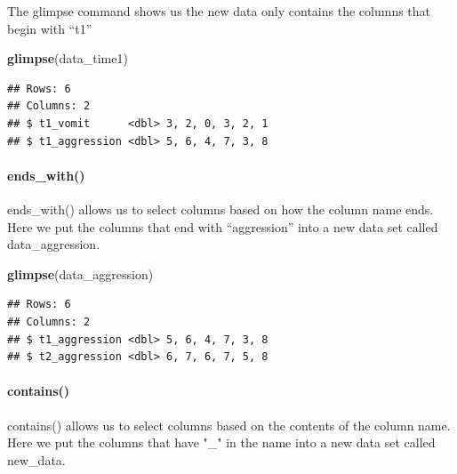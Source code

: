 \documentclass[
]{krantz}
\makeatletter
\newenvironment{Shaded}{\begin{snugshade}}{\end{snugshade}}
\newcommand{\KeywordTok}[1]{\textcolor[rgb]{0.27,0.27,0.27}{\textbf{#1}}}
\newcommand{\NormalTok}[1]{#1}
\newcommand{\OperatorTok}[1]{\textcolor[rgb]{0.43,0.43,0.43}{\textbf{#1}}}
\newcommand{\StringTok}[1]{\textcolor[rgb]{0.5,0.5,0.5}{#1}}
\newenvironment{kframe}{%
\medskip{}
\setlength{\fboxsep}{.8em}
 \def\at@end@of@kframe{}%
 \ifinner\ifhmode%
  \def\at@end@of@kframe{\end{minipage}}%
  \begin{minipage}{\columnwidth}%
 \fi\fi%
 \def\FrameCommand##1{\hskip\@totalleftmargin \hskip-\fboxsep
 \colorbox{shadecolor}{##1}\hskip-\fboxsep
     \hskip-\linewidth \hskip-\@totalleftmargin \hskip\columnwidth}%
 \MakeFramed {\advance\hsize-\width
   \@totalleftmargin\z@ \linewidth\hsize
   \@setminipage}}%
 {\par\unskip\endMakeFramed%
 \at@end@of@kframe}
\renewenvironment{Shaded}{\begin{kframe}}{\end{kframe}}
\makeatother
\begin{document}
The glimpse command shows us the new data only contains the columns that begin with ``t1''

\begin{Shaded}
\begin{Highlighting}[]
\KeywordTok{glimpse}\NormalTok{(data_time1)}
\end{Highlighting}
\end{Shaded}

\begin{verbatim}
## Rows: 6
## Columns: 2
## $ t1_vomit      <dbl> 3, 2, 0, 3, 2, 1
## $ t1_aggression <dbl> 5, 6, 4, 7, 3, 8
\end{verbatim}

\hypertarget{ends_with}{%
\paragraph{ends\_with()}\label{ends_with}}

ends\_with() allows us to select columns based on how the column name ends. Here we put the columns that end with ``aggression'' into a new data set called data\_aggression.

\begin{Shaded}
\end{Shaded}

\begin{Shaded}
\begin{Highlighting}[]
\KeywordTok{glimpse}\NormalTok{(data_aggression)}
\end{Highlighting}
\end{Shaded}

\begin{verbatim}
## Rows: 6
## Columns: 2
## $ t1_aggression <dbl> 5, 6, 4, 7, 3, 8
## $ t2_aggression <dbl> 6, 7, 6, 7, 5, 8
\end{verbatim}

\hypertarget{contains}{%
\paragraph{contains()}\label{contains}}

contains() allows us to select columns based on the contents of the column name. Here we put the columns that have "\_" in the name into a new data set called new\_data.
\end{document}
